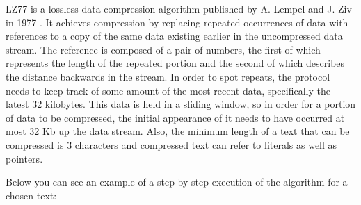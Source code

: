 LZ77 is a lossless data compression algorithm published by A. Lempel and J. Ziv
in 1977 \cite{lz77}. It achieves compression by replacing repeated occurrences
of data with references to a copy of the same data existing earlier in the
uncompressed data stream. The reference is composed of a pair of numbers, the
first of which represents the length of the repeated portion and the second of
which describes the distance backwards in the stream. In order to spot repeats,
the protocol needs to keep track of some amount of the most recent data,
specifically the latest 32 kilobytes. This data is held in a sliding window, so
in order for a portion of data to be compressed, the initial appearance of it
needs to have occurred at most 32 Kb up the data stream. Also, the minimum
length of a text that can be compressed is 3 characters and compressed text can
refer to literals as well as pointers.

Below you can see an example of a step-by-step execution of the algorithm for a
chosen text:


